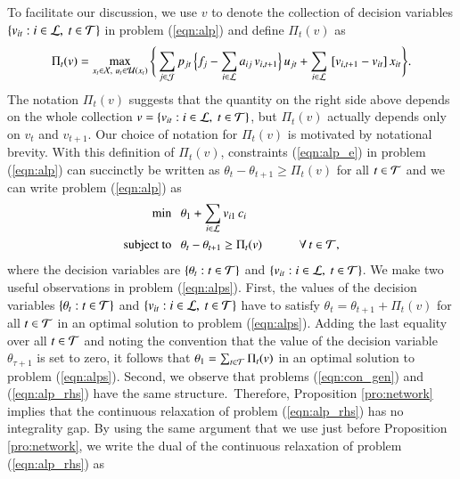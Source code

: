 To facilitate our discussion, we use $v$ to denote the collection of decision variables $\{ v_{it} : i \in {\cal L},~ t \in {\cal T}\}$ in problem (\ref{eqn:alp}) and define $\Pi_t(v)$ as
%
%
\begin{align}
\Pi_t(v) 
= 
\max_{x_t \in {\cal X},~ u_t \in {\cal U}(x_t)} 
\Bigg\{
\sum_{j \in {\cal J}} p_{jt} {\,} \Big\{ f_j - \sum_{i \in {\cal L}} a_{ij} {\,} v_{i,t+1} \Big\} {\,} u_{jt}
+
\sum_{i \in {\cal L}} {\,} [ v_{i,t+1} - v_{it} ] {\,} x_{it}
\Bigg\}.
\label{eqn:alp_rhs}
\end{align}
%
%
The notation $\Pi_t(v)$ suggests that the quantity on the right side above depends on the whole collection $v = \{ v_{it} : i \in {\cal L},~ t \in {\cal T}\}$, but $\Pi_t(v)$ actually depends only on $v_t$ and $v_{t+1}$. Our choice of notation for $\Pi_t(v)$ is motivated by notational brevity. With this definition of $\Pi_t(v)$, constraints (\ref{eqn:alp_e}) in problem (\ref{eqn:alp}) can succinctly be written as $\theta_t - \theta_{t+1} \geq \Pi_t(v)$ for all $t \in {\cal T}$ and we can write problem (\ref{eqn:alp}) as
%
%
\begin{subequations}
\label{eqn:alps}
\begin{align}
\min ~~~ & \theta_1 + \sum_{i \in {\cal L}} v_{i1} {\,} c_i
\label{eqn:alps_obj}
\\
\mbox{subject to}~~~ & \theta_t - \theta_{t+1} \geq \Pi_t(v) \qquad \quad
\forall {\,} t \in {\cal T},
\label{eqn:alps_e}
\end{align}
\end{subequations}
%
%
where the decision variables are $\{\theta_t : t \in {\cal T}\}$ and $\{ v_{it} : i \in {\cal L},~ t \in {\cal T}\}$. We make two useful observations in problem (\ref{eqn:alps}). First, the values of the decision variables $\{\theta_t : t \in {\cal T}\}$ and $\{ v_{it} : i \in {\cal L},~ t \in {\cal T}\}$ have to satisfy $\theta_t = \theta_{t+1} + \Pi_t(v)$ for all $t \in {\cal T}$ in an optimal solution to problem (\ref{eqn:alps}). Adding the last equality over all $t \in {\cal T}$ and noting the convention that the value of the decision variable $\theta_{\tau + 1}$ is set to zero, it follows that $\theta_1 = \sum_{t \in {\cal T}} \Pi_t(v)$ in an optimal solution to problem (\ref{eqn:alps}). Second, we observe that problems (\ref{eqn:con_gen}) and (\ref{eqn:alp_rhs}) have the same structure.~Therefore, Proposition \ref{pro:network} implies that the continuous relaxation of problem (\ref{eqn:alp_rhs}) has no integrality gap. By using the same argument that we use just before Proposition \ref{pro:network}, we write the dual of the continuous relaxation of problem (\ref{eqn:alp_rhs}) as 
